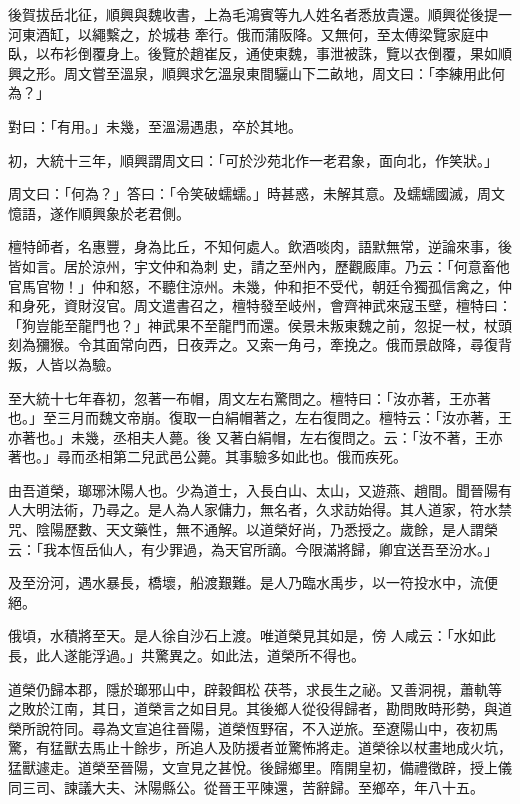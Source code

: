 \begin{pinyinscope}
 後賀拔岳北征，順興與魏收書，上為毛鴻賓等九人姓名者悉放貴還。順興從後提一河東酒缸，以繩繫之，於城巷
 牽行。俄而蒲阪降。又無何，至太傅梁覽家庭中臥，以布衫倒覆身上。後覽於趙崔反，通使東魏，事泄被誅，覽以衣倒覆，果如順興之形。周文嘗至溫泉，順興求乞溫泉東間驪山下二畝地，周文曰：「李練用此何為？」



 對曰：「有用。」未幾，至溫湯遇患，卒於其地。



 初，大統十三年，順興謂周文曰：「可於沙苑北作一老君象，面向北，作笑狀。」



 周文曰：「何為？」答曰：「令笑破蠕蠕。」時甚惑，未解其意。及蠕蠕國滅，周文憶語，遂作順興象於老君側。



 檀特師者，名惠豐，身為比丘，不知何處人。飲酒啖肉，語默無常，逆論來事，後皆如言。居於涼州，宇文仲和為刺
 史，請之至州內，歷觀廄庫。乃云：「何意畜他官馬官物！」仲和怒，不聽住涼州。未幾，仲和拒不受代，朝廷令獨孤信禽之，仲和身死，資財沒官。周文遣書召之，檀特發至岐州，會齊神武來寇玉壁，檀特曰：「狗豈能至龍門也？」神武果不至龍門而還。侯景未叛東魏之前，忽捉一杖，杖頭刻為獼猴。令其面常向西，日夜弄之。又索一角弓，牽挽之。俄而景啟降，尋復背叛，人皆以為驗。



 至大統十七年春初，忽著一布帽，周文左右驚問之。檀特曰：「汝亦著，王亦著也。」至三月而魏文帝崩。復取一白絹帽著之，左右復問之。檀特云：「汝亦著，王亦著也。」未幾，丞相夫人薨。後
 又著白絹帽，左右復問之。云：「汝不著，王亦著也。」尋而丞相第二兒武邑公薨。其事驗多如此也。俄而疾死。



 由吾道榮，瑯琊沐陽人也。少為道士，入長白山、太山，又遊燕、趙間。聞晉陽有人大明法術，乃尋之。是人為人家傭力，無名者，久求訪始得。其人道家，符水禁咒、陰陽歷數、天文藥性，無不通解。以道榮好尚，乃悉授之。歲餘，是人謂榮云：「我本恆岳仙人，有少罪過，為天官所謫。今限滿將歸，卿宜送吾至汾水。」



 及至汾河，遇水暴長，橋壞，船渡艱難。是人乃臨水禹步，以一符投水中，流便絕。



 俄頃，水積將至天。是人徐自沙石上渡。唯道榮見其如是，傍
 人咸云：「水如此長，此人遂能浮過。」共驚異之。如此法，道榮所不得也。



 道榮仍歸本郡，隱於瑯邪山中，辟穀餌松茯苓，求長生之祕。又善洞視，蕭軌等之敗於江南，其日，道榮言之如目見。其後鄉人從役得歸者，勘問敗時形勢，與道榮所說符同。尋為文宣追往晉陽，道榮恆野宿，不入逆旅。至遼陽山中，夜初馬驚，有猛獸去馬止十餘步，所追人及防援者並驚怖將走。道榮徐以杖畫地成火坑，猛獸遽走。道榮至晉陽，文宣見之甚悅。後歸鄉里。隋開皇初，備禮徵辟，授上儀同三司、諫議大夫、沐陽縣公。從晉王平陳還，苦辭歸。至鄉卒，年八十五。




\end{pinyinscope}
